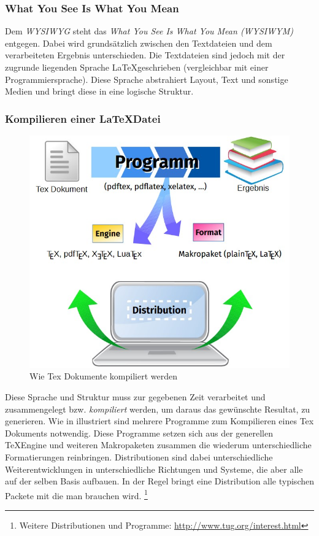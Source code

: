 \subsubsection{What You See Is What You Mean}
Dem \textit{WYSIWYG} steht das \textit{What You See Is What You Mean (WYSIWYM)} entgegen. Dabei wird grundsätzlich zwischen den Textdateien und dem verarbeiteten Ergebnis unterschieden. Die Textdateien sind jedoch mit der zugrunde liegenden Sprache \LaTeX geschrieben (vergleichbar mit einer Programmiersprache). Diese Sprache abstrahiert Layout, Text und sonstige Medien und bringt diese in eine logische Struktur.

\subsubsection{Kompilieren einer \LaTeX Datei}
\begin{figure}
    \centering
    \includegraphics[scale=0.5]{bilder/latex-compiler.jpg}
    \caption{Wie Tex Dokumente kompiliert werden}
    \label{fig.kompiler}
\end{figure}

Diese Sprache und Struktur muss zur gegebenen Zeit verarbeitet und zusammengelegt bzw. \textit{kompiliert} werden, um daraus das gewünschte Resultat, zu generieren. Wie in illustriert sind mehrere Programme zum Kompilieren eines Tex Dokuments notwendig.
Diese Programme setzen sich aus der generellen \TeX Engine und weiteren Makropaketen zusammen die wiederum unterschiedliche Formatierungen reinbringen.
Distributionen sind dabei unterschiedliche Weiterentwicklungen in unterschiedliche Richtungen und Systeme, die aber alle auf der selben Basis aufbauen. In der Regel bringt eine Distribution alle typischen Packete mit die man brauchen wird.
\footnote{Weitere Distributionen und Programme: \url{http://www.tug.org/interest.html}}

